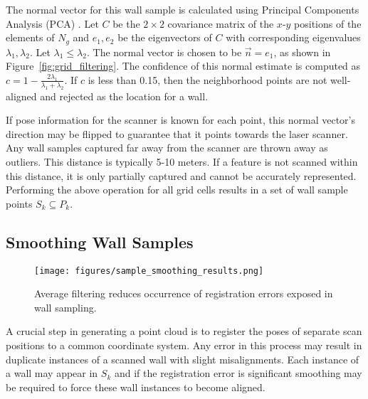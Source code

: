 \documentclass[10pt,twocolumn,letterpaper]{article}
\begin{document}
The normal vector for this wall sample is calculated using Principal Components Analysis (PCA) \cite{PCA}.  Let $C$ be the $2 \times 2$ covariance matrix of the $x$-$y$ positions of the elements of $N_g$ and $e_1, e_2$ be the eigenvectors of $C$ with corresponding eigenvalues $\lambda_1, \lambda_2$.  
Let $\lambda_1 \leq \lambda_2$.  The normal vector is chosen to be $\vec{n} = e_1$, as shown in Figure~\ref{fig:grid_filtering}.  The confidence of this normal estimate is computed as $c = 1 - \frac{2 \lambda_1}{\lambda_1 + \lambda_2}$.  If $c$ is less than 0.15, then the neighborhood points are not well-aligned and rejected as the location for a wall.

If pose information for the scanner is known for each point, this normal vector's direction may be flipped to guarantee that it points towards the laser scanner.  Any wall samples captured far away from the scanner are thrown away as outliers.  This distance is typically 5-10 meters.  If a feature is not scanned within this distance, it is only partially captured and cannot be accurately represented. Performing the above operation for all grid cells results in a set of wall sample points $S_k \subseteq P_k$.

\subsection{Smoothing Wall Samples}
\label{sec:smoothing}

\begin{figure}[t]

\begin{minipage}[b]{1.0\linewidth}
  \centering
  \centerline{\texttt{[image: figures/sample\_smoothing\_results.png]}}
\end{minipage}

\caption{Average filtering reduces occurrence of registration errors exposed in wall sampling.}
\label{fig:sample_smoothing_results}

\end{figure}

A crucial step in generating a point cloud is to register the poses of separate scan positions to a common coordinate system.  Any error in this process may result in duplicate instances of a scanned wall with slight misalignments.  Each instance of a wall may appear in $S_k$ and if the registration error is significant smoothing may be required to force these wall instances to become aligned.
\end{document}
